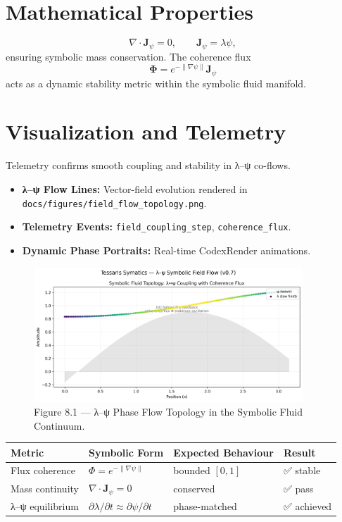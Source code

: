 \documentclass[11pt]{article}
\begin{document}
\section{Mathematical Properties}
\[
\nabla\cdot\mathbf{J}_\psi = 0, \qquad
\mathbf{J}_\psi = \lambda\psi,
\]
ensuring symbolic mass conservation.  
The coherence flux
\[
\mathbf{Φ} = e^{-\lVert\nabla\psi\rVert}\mathbf{J}_\psi
\]
acts as a dynamic stability metric within the symbolic fluid manifold.

\section{Visualization and Telemetry}
Telemetry confirms smooth coupling and stability in λ–ψ co-flows.

\begin{itemize}
  \item \textbf{λ–ψ Flow Lines:} Vector-field evolution rendered in
    \texttt{docs/figures/field\_flow\_topology.png}.
  \item \textbf{Telemetry Events:}
    \texttt{field\_coupling\_step}, \texttt{coherence\_flux}.
  \item \textbf{Dynamic Phase Portraits:} Real-time CodexRender animations.
\end{itemize}

\begin{figure}[h!]
\centering
\includegraphics[width=0.9\textwidth]{docs/figures/field_flow_topology.png}
\caption{Figure 8.1 — λ–ψ Phase Flow Topology in the Symbolic Fluid Continuum.}
\end{figure}

\begin{center}
\renewcommand{\arraystretch}{1.3}
\begin{tabular}{llll}
\toprule
\textbf{Metric} & \textbf{Symbolic Form} & \textbf{Expected Behaviour} & \textbf{Result}\\
\midrule
Flux coherence & $\Phi = e^{-\lVert\nabla\psi\rVert}$ & bounded $[0,1]$ & ✅ stable\\
Mass continuity & $\nabla\cdot\mathbf{J}_\psi = 0$ & conserved & ✅ pass\\
λ–ψ equilibrium & $∂\lambda/∂t ≈ ∂\psi/∂t$ & phase-matched & ✅ achieved\\
\bottomrule
\end{tabular}
\end{center}
\end{document}
